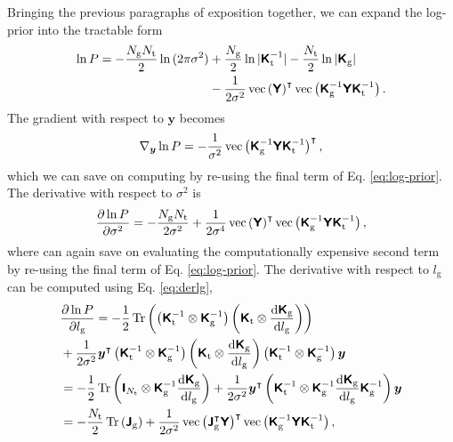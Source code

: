 \documentclass[fleqn,usenatbib]{mnras}
\begin{document}
Bringing the previous paragraphs of exposition together, we can expand the log-prior into the tractable form
\begin{align}
    \ln{P} = -\frac{N_\text{g}N_\text{t}}{2}\ln{(2\pi\sigma^2)} &+ \frac{N_\text{g}}{2}\ln|\textbf{\textsf{K}}_\text{t}^{-1}|- \frac{N_\text{t}}{2}\ln|\textbf{\textsf{K}}_\text{g}| \nonumber \\
    &- \frac{1}{2\sigma^2}\operatorname{vec}\left(\textbf{\textsf{Y}}\right)^\intercal\operatorname{vec}\left(\textbf{\textsf{K}}_\text{g}^{-1}\textbf{\textsf{Y}}\textbf{\textsf{K}}_\text{t}^{-1}\right). \label{eq:log-prior}
\end{align}
The gradient with respect to $\bm{y}$ becomes
\begin{equation}
    \nabla_{\bm{y}}\ln P = -\frac{1}{\sigma^2}\operatorname{vec}\left(\textbf{\textsf{K}}_\text{g}^{-1}\textbf{\textsf{Y}}\textbf{\textsf{K}}_\text{t}^{-1}\right)^\intercal,
\end{equation}
which we can save on computing by re-using the final term of Eq. \ref{eq:log-prior}. The derivative with respect to $\sigma^2$ is
\begin{equation}
    \frac{\partial\ln P}{\partial\sigma^2} = -\frac{N_\text{g}N_\text{t}}{2\sigma^2}+\frac{1}{2\sigma^4}\operatorname{vec}\left(\textbf{\textsf{Y}}\right)^\intercal\operatorname{vec}\left(\textbf{\textsf{K}}_\text{g}^{-1}\textbf{\textsf{Y}}\textbf{\textsf{K}}_\text{t}^{-1}\right),
\end{equation}
where can again save on evaluating the computationally expensive second term by re-using the final term of Eq. \ref{eq:log-prior}. The derivative with respect to $l_\text{g}$ can be computed using Eq. \ref{eq:derlg},
\begin{align}
    &\frac{\partial\ln P}{\partial l_\text{g}} = -\frac{1}{2}\operatorname{Tr}\left(\left(\textbf{\textsf{K}}_\text{t}^{-1}\otimes\textbf{\textsf{K}}_\text{g}^{-1} \right)\left(\textbf{\textsf{K}}_\text{t}\otimes\frac{\text{d}\textbf{\textsf{K}}_\text{g}}{\text{d}l_\text{g}} \right)\right) \nonumber \\
    &+ \frac{1}{2\sigma^2}\bm{y}^\intercal\left(\textbf{\textsf{K}}_\text{t}^{-1}\otimes\textbf{\textsf{K}}_\text{g}^{-1} \right) \left(\textbf{\textsf{K}}_\text{t}\otimes\frac{\text{d}\textbf{\textsf{K}}_\text{g}}{\text{d}l_\text{g}} \right) \left(\textbf{\textsf{K}}_\text{t}^{-1}\otimes\textbf{\textsf{K}}_\text{g}^{-1} \right) \bm{y} \nonumber \\
    &= -\frac{1}{2}\operatorname{Tr}\left(\textbf{\textsf{I}}_{N_\text{t}}\otimes\textbf{\textsf{K}}_\text{g}^{-1}\frac{\text{d}\textbf{\textsf{K}}_\text{g}}{\text{d}l_\text{g}} \right) + \frac{1}{2\sigma^2}\bm{y}^\intercal\left(\textbf{\textsf{K}}_\text{t}^{-1}\otimes \textbf{\textsf{K}}_\text{g}^{-1} \frac{\text{d}\textbf{\textsf{K}}_\text{g}}{\text{d}l_\text{g}} \textbf{\textsf{K}}_\text{g}^{-1}\right) \bm{y} \nonumber \\
    &= -\frac{N_\text{t}}{2}\operatorname{Tr}\left(\textbf{\textsf{J}}_\text{g}\right) + \frac{1}{2\sigma^2}\operatorname{vec}\left(\textbf{\textsf{J}}_\text{g}^\intercal\textbf{\textsf{Y}}\right)^\intercal \operatorname{vec}\left(\textbf{\textsf{K}}_\text{g}^{-1}\textbf{\textsf{Y}}\textbf{\textsf{K}}_\text{t}^{-1}\right),
\end{align}
\end{document}
